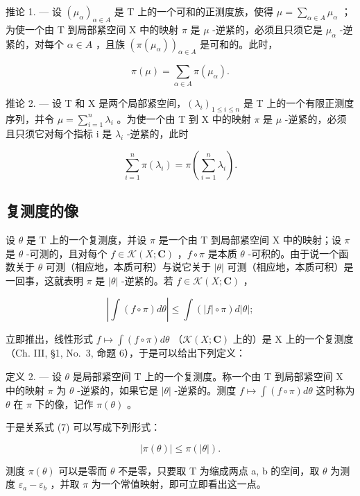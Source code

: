 推论 1. --- 设 \((\mu_{\alpha})_{\alpha \in A}\) 是 T 上的一个可和的正测度族，使得 \(\mu = \sum_{\alpha \in A} \mu_{\alpha}\) ；为使一个由 T 到局部紧空间 X 中的映射 \(\pi\) 是 \(\mu\) -逆紧的，必须且只须它是 \(\mu_{\alpha}\) -逆紧的，对每个 \(\alpha \in A\) ，且族 \((\pi(\mu_{\alpha}))_{\alpha \in A}\) 是可和的。此时，

\[
\pi (\mu) = \sum_ {\alpha \in A} \pi (\mu_ {\alpha}).\tag{6}
\]

推论 2. --- 设 T 和 X 是两个局部紧空间，\((\lambda_{i})_{1\leqslant i\leqslant n}\) 是 T 上的一个有限正测度序列，并令 \(\mu=\sum_{i=1}^{n}\lambda_{i}\) 。为使一个由 T 到 X 中的映射 \(\pi\) 是 \(\mu\) -逆紧的，必须且只须它对每个指标 i 是 \(\lambda_{i}\) -逆紧的，此时

\[
\sum_ {i = 1} ^ {n} \pi (\lambda_ {i}) = \pi \left(\sum_ {i = 1} ^ {n} \lambda_ {i}\right).
\]

\subsection{复测度的像}

设 \(\theta\) 是 T 上的一个复测度，并设 \(\pi\) 是一个由 T 到局部紧空间 X 中的映射；设 \(\pi\) 是 \(\theta\) -可测的，且对每个 \(f \in \mathcal{K}(X; \mathbf{C})\) ，\(f \circ \pi\) 是本质 \(\theta\) -可积的。由于说一个函数关于 \(\theta\) 可测（相应地，本质可积）与说它关于 \(|\theta|\) 可测（相应地，本质可积）是一回事，这就表明 \(\pi\) 是 \(|\theta|\) -逆紧的。若 \(f \in \mathcal{K}(X; \mathbf{C})\) ，

\[
\left| \int (f \circ \pi) d \theta \right| \leqslant \int (| f | \circ \pi) d | \theta |;\tag{7}
\]

立即推出，线性形式 \(f \mapsto \int(f \circ \pi) d\theta\) （\(\mathcal{K}(X; \mathbf{C})\) 上的）是 X 上的一个复测度（Ch. III, §1, No.~3, 命题 6），于是可以给出下列定义：

定义 2. --- 设 \(\theta\) 是局部紧空间 T 上的一个复测度。称一个由 T 到局部紧空间 X 中的映射 \(\pi\) 为 \(\theta\) -逆紧的，如果它是 \(|\theta|\) -逆紧的。测度 \(f \mapsto \int(f \circ \pi) d\theta\) 这时称为 \(\theta\) 在 \(\pi\) 下的像，记作 \(\pi(\theta)\) 。

于是关系式 (7) 可以写成下列形式：

\[
| \pi (\theta) | \leqslant \pi (| \theta |).\tag{8}
\]

测度 \(\pi(\theta)\) 可以是零而 \(\theta\) 不是零，只要取 T 为缩成两点 a, b 的空间，取 \(\theta\) 为测度 \(\varepsilon_{a} - \varepsilon_{b}\) ，并取 \(\pi\) 为一个常值映射，即可立即看出这一点。

